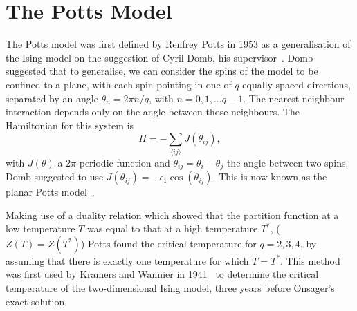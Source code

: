 \documentclass[11pt, a4paper]{report} %
\begin{document}
\section{The Potts Model}
The Potts model was first defined by Renfrey Potts in 1953 as a generalisation of the Ising model on the suggestion of Cyril Domb, his supervisor~\cite{potts:1952}.
Domb suggested that to generalise, we can consider the spins of the model to be confined to a plane, with each spin pointing in one of \(q\) equally spaced directions, separated by an angle \(\theta_n = 2\pi n /q\), with \(n = 0, 1, \ldots q - 1\).
The nearest neighbour interaction depends only on the angle between those neighbours.
The Hamiltonian for this system is
\begin{equation}
	H = - \sum_{\langle i j \rangle} J(\theta_{ij}),
\end{equation}
with \(J(\theta)\) a \(2\pi\)-periodic function and \(\theta_{ij} = \theta_i - \theta_j\) the angle between two spins.
Domb suggested to use \(J(\theta_{ij}) = - \epsilon_1\cos(\theta_{ij})\).
This is now known as the planar Potts model~\cite{wu:1982}.

Making use of a duality relation which showed that the partition function at a low temperature \(T\) was equal to that at a high temperature \(T^*\), (\(Z(T)=Z(T^*)\)) Potts found the critical temperature for \(q=2, 3, 4\), by assuming that there is exactly one temperature for which \(T=T^*\).
This method was first used by Kramers and Wannier in 1941~\cite{kramers:1941} to determine the critical temperature of the two-dimensional Ising model, three years before Onsager's exact solution.
\end{document}
